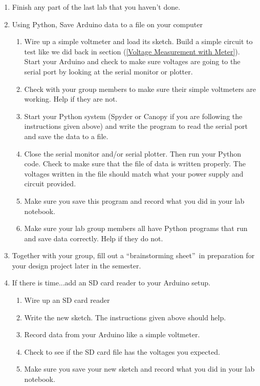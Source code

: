 \begin{enumerate}
\item Finish any part of the last lab that you haven't done.

\item Using Python, Save Arduino data to a file on your computer

\begin{enumerate}
\item Wire up a simple voltmeter and load its sketch. Build a simple circuit
to test like we did back in section (\ref{Voltage Measurement with Meter}).
Start your Arduino and check to make sure voltages are going to the serial
port by looking at the serial monitor or plotter.

\item Check with your group members to make sure their simple voltmeters are
working. Help if they are not.

\item Start your Python system (Spyder or Canopy if you are following the
instructions given above) and write the program to read the serial port and
save the data to a file.

\item Close the serial monitor and/or serial plotter. Then run your Python
code. Check to make sure that the file of data is written properly. The
voltages written in the file should match what your power supply and circuit
provided.

\item Make sure you save this program and record what you did in your lab
notebook.

\item Make sure your lab group members all have Python programs that run and
save data correctly. Help if they do not.
\end{enumerate}

\item Together with your group, fill out a \textquotedblleft brainstorming
sheet\textquotedblright\ in preparation for your design project later in the
semester.

\item If there is time...add an SD card reader to your Arduino setup.

\begin{enumerate}
\item Wire up an SD card reader

\item Write the new sketch. The instructions given above should help.

\item Record data from your Arduino like a simple voltmeter.

\item Check to see if the SD card file has the voltages you expected.

\item Make sure you save your new sketch and record what you did in your lab
notebook.
\end{enumerate}
\end{enumerate}